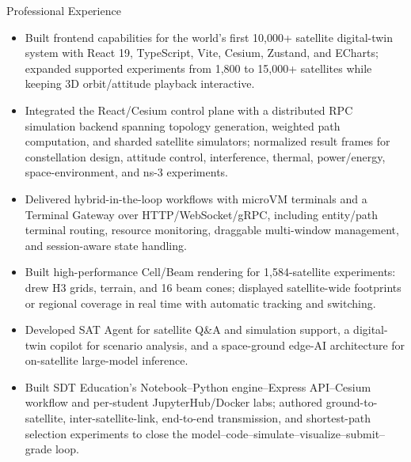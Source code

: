 \documentclass{resume} %
\begin{document}
\begin{workSection}{Professional Experience}

     \experienceItem[
        company=Space AIC,
        location=Shanghai{,} China,
        position=Software Engineer,
        duration=Mar. 2026 -- Present
    ]
     \vspace{-0.5em}
    \begin{itemize}
        \itemsep -6pt {}
        \item Built frontend capabilities for the world's first 10,000+ satellite digital-twin system with React 19, TypeScript, Vite, Cesium, Zustand, and ECharts; expanded supported experiments from 1,800 to 15,000+ satellites while keeping 3D orbit/attitude playback interactive.
        \item Integrated the React/Cesium control plane with a distributed RPC simulation backend spanning topology generation, weighted path computation, and sharded satellite simulators; normalized result frames for constellation design, attitude control, interference, thermal, power/energy, space-environment, and ns-3 experiments.
        \item Delivered hybrid-in-the-loop workflows with microVM terminals and a Terminal Gateway over HTTP/WebSocket/gRPC, including entity/path terminal routing, resource monitoring, draggable multi-window management, and session-aware state handling.
        \item Built high-performance Cell/Beam rendering for 1,584-satellite experiments: drew H3 grids, terrain, and 16 beam cones; displayed satellite-wide footprints or regional coverage in real time with automatic tracking and switching.
        \item Developed SAT Agent for satellite Q\&A and simulation support, a digital-twin copilot for scenario analysis, and a space-ground edge-AI architecture for on-satellite large-model inference.
        \item Built SDT Education's Notebook--Python engine--Express API--Cesium workflow and per-student JupyterHub/Docker labs; authored ground-to-satellite, inter-satellite-link, end-to-end transmission, and shortest-path selection experiments to close the model--code--simulate--visualize--submit--grade loop.
     \end{itemize}


\end{workSection}
\end{document}
